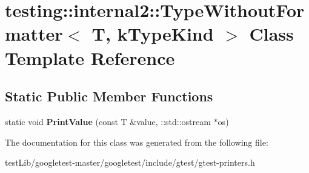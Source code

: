\hypertarget{classtesting_1_1internal2_1_1TypeWithoutFormatter}{}\section{testing\+:\+:internal2\+:\+:Type\+Without\+Formatter$<$ T, k\+Type\+Kind $>$ Class Template Reference}
\label{classtesting_1_1internal2_1_1TypeWithoutFormatter}
\subsection*{Static Public Member Functions}
\begin{DoxyCompactItemize}
\item 
\mbox{\label{classtesting_1_1internal2_1_1TypeWithoutFormatter_a6651f6f7be2c0f899729eeb6038f76d3}} 
static void {\bfseries Print\+Value} (const T \&value, \+::std\+::ostream $\ast$os)
\end{DoxyCompactItemize}


The documentation for this class was generated from the following file\+:\begin{DoxyCompactItemize}
\item 
test\+Lib/googletest-\/master/googletest/include/gtest/gtest-\/printers.\+h\end{DoxyCompactItemize}
